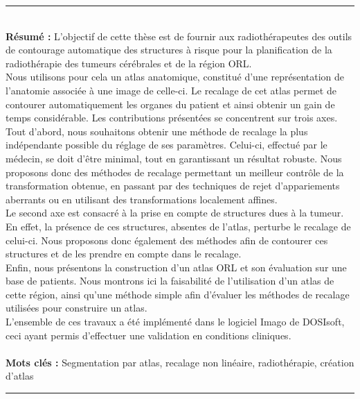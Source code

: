 \documentclass[a4paper,12pt,twoside]{StyleThese}
\begin{document}
\cleardoublepage
\begin{vcenterpage}
\noindent\rule[2pt]{\textwidth}{0.5pt}
\\
{\large\textbf{Résumé :}}
L'objectif de cette thèse est de fournir aux radiothérapeutes des outils de contourage automatique des structures à risque pour la planification de la radiothérapie des tumeurs cérébrales et de la région ORL.
\\
Nous utilisons pour cela un atlas anatomique, constitué d'une représentation de l'anatomie associée à une image de celle-ci. Le recalage de cet atlas permet de contourer automatiquement les organes du patient et ainsi obtenir un gain de temps considérable. Les contributions présentées se concentrent sur trois axes.
\\
Tout d'abord, nous souhaitons obtenir une méthode de recalage la plus indépendante possible du réglage de ses paramètres. Celui-ci, effectué par le médecin, se doit d'être minimal, tout en garantissant un résultat robuste. Nous proposons donc des méthodes de recalage permettant un meilleur contrôle de la transformation obtenue, en passant par des techniques de rejet d'appariements aberrants ou en utilisant des transformations localement affines.
\\
Le second axe est consacré à la prise en compte de structures dues à la tumeur. En effet, la présence de ces structures, absentes de l'atlas, perturbe le recalage de celui-ci. Nous proposons donc également des méthodes afin de contourer ces structures et de les prendre en compte dans le recalage.
\\
Enfin, nous présentons la construction d'un atlas ORL et son évaluation sur une base de patients. Nous montrons ici la faisabilité de l'utilisation d'un atlas de cette région, ainsi qu'une méthode simple afin d'évaluer les méthodes de recalage utilisées pour construire un atlas.
\\
L'ensemble de ces travaux a été implémenté dans le logiciel Imago de DOSIsoft, ceci ayant permis d'effectuer une validation en conditions cliniques.
\\
\\
{\large\textbf{Mots clés :}}
Segmentation par atlas, recalage non linéaire, radiothérapie, création d'atlas
\\
\noindent\rule[2pt]{\textwidth}{0.5pt}
\end{vcenterpage}
\end{document}
